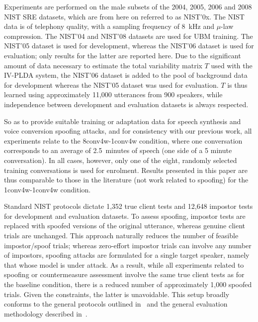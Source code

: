 
Experiments are performed on the male subsets of the 2004, 2005, 2006 and 2008 NIST SRE datasets, which are from here on referred to as NIST'0x.  The NIST data is of telephony quality, with a sampling frequency of 8~kHz and $\mu$-law compression.
The NIST'04 and NIST'08 datasets are used for UBM training.
The NIST'05 dataset is used for development, whereas the NIST'06 dataset is used for evaluation;  
only results for the latter are reported here.
Due to the significant amount of data necessary to estimate the total variability matrix $T$ used with the IV-PLDA system, the NIST'06 dataset is added to the pool of background data for development whereas the NIST'05 dataset was used for evaluation. 
$T$ is thus learned using approximately 11,000 utterances from 900 speakers, while independence between development and evaluation datasets is always respected.
 
So as to provide suitable training or adaptation data for speech synthesis and voice conversion spoofing attacks, and for consistency with our previous work, all experiments relate to the 8conv4w-1conv4w condition, where one conversation corresponds to an average of 2.5~minutes of speech (one side of a 5 minute conversation).
In all cases, however, only one of the eight, randomly selected training conversations is used for enrolment. 
Results presented in this paper are thus comparable to those in the literature (not work related to spoofing) for the 1conv4w-1conv4w condition. 

Standard NIST protocols dictate 1,352 true client tests and 12,648 impostor tests for development and evaluation datasets. 
To assess spoofing, impostor tests are replaced with spoofed versions of the original utterance, whereas genuine client trials are unchanged.
This approach naturally reduces the number of feasible impostor/spoof trials; whereas zero-effort impostor trials can involve any number of impostors, spoofing attacks are formulated for a single target speaker, namely that whose model is under attack.  As a result, while all experiments related to spoofing or countermeasure assessment involve the same true client tests as for the baseline condition, there is a reduced number of approximately 1,000 spoofed trials.  Given the constraints, the latter is unavoidable.  This setup broadly conforms to the general protocols outlined in~\cite{Wu2014a,Wu2015} and the general evaluation methodology described in~\cite{Hadid2015}.


